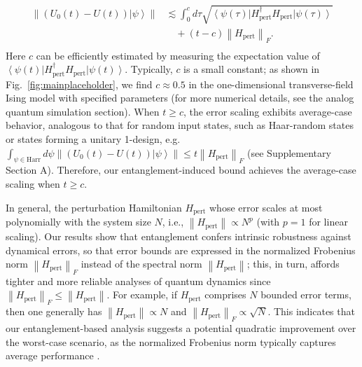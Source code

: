\documentclass[12pt]{article}
\newcommand{\ket}[1]{\left|#1\right\rangle}
\newcommand{\bra}[1]{\left\langle #1\right|}
\newcommand{\norm}[1]{\left\lVert #1\right\rVert}
\begin{document}
\begin{equation}
\begin{split}
         \norm{(U_0(t)-U(t))\ket{\psi}}&\lesssim 
                 \int_0 ^c d\tau \sqrt{\bra{\psi(\tau)} H_{\text{pert}} ^\dagger  H_{\text{pert}}  \ket{\psi(\tau)}}\\
                 &\quad+(t-c) \norm{H_{\text{pert}} }_F.\\
\end{split}\label{Eq:mainlongtime}
\end{equation}
Here $c$ can be efficiently estimated by measuring the expectation value of $\bra{\psi(t)}H_{\text{pert}}^\dagger H_{\text{pert}}\ket{\psi(t)}$. Typically, $c$ is a small constant; as shown in Fig.~\ref{fig:mainplaceholder}, we find $c\approx 0.5$ in the one-dimensional transverse-field Ising model with specified parameters (for more numerical details, see the analog quantum simulation section).
When $t\ge c$, the error scaling exhibits average-case behavior, analogous to that for random input states, such as Haar-random states or states forming a unitary 1-design, e.g. 
           $\int_{\psi\in \text{Harr}} d\psi \norm{ (U_0(t)-U(t))\ket{\psi}} \le   t \norm{H_{\text{pert}} }_F$ (see  Supplementary Section A).
Therefore, our entanglement-induced bound achieves the average-case scaling when $t\ge c$. 


In general, the perturbation Hamiltonian $H_{\mathrm{pert}}$ whose error scales at most polynomially with the system size $N$, i.e., $\norm{H_{\mathrm{pert}}} \propto N^{p}$ (with $p=1$ for linear scaling).
Our results show that entanglement confers intrinsic robustness against dynamical errors, so that error bounds are expressed in the normalized Frobenius norm $\norm{H_{\mathrm{pert}}}_F$ instead of the spectral norm $\norm{H_{\mathrm{pert}}}$; this, in turn, affords tighter and more reliable analyses of quantum dynamics since $\norm{H_{\mathrm{pert}}}_F\le\norm{H_{\mathrm{pert}}}$. For example, if $H_{\mathrm{pert}}$ comprises $N$ bounded error terms, then one generally has $\norm{H_{\mathrm{pert}}} \propto N $ and $\norm{H_{\mathrm{pert}}}_{F} \propto \sqrt{N}$. This indicates that our entanglement-based analysis suggests a potential quadratic improvement over the worst-case scenario, as the normalized Frobenius norm typically captures average performance \cite{zhaoHamiltonianSimulationRandom2021,chen2024average, kahanamokumeyer2025logdepthinplacequantumfourier}.
\end{document}
